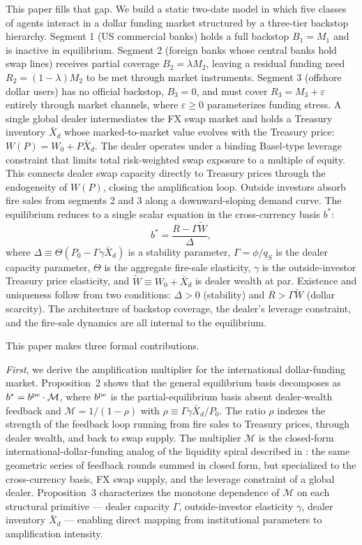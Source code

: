 This paper fills that gap. We build a static two-date model in which five classes of agents interact
in a dollar funding market structured by a three-tier backstop hierarchy. Segment 1 (US commercial
banks) holds a full backstop $B_1 = M_1$ and is inactive in equilibrium. Segment 2 (foreign banks
whose central banks hold swap lines) receives partial coverage $B_2 = \lambda M_2$, leaving a
residual funding need $R_2 = (1-\lambda)M_2$ to be met through market instruments. Segment 3
(offshore dollar users) has no official backstop, $B_3 = 0$, and must cover $R_3 = M_3 + \varepsilon$
entirely through market channels, where $\varepsilon \geq 0$ parameterizes funding stress. A single
global dealer intermediates the FX swap market and holds a Treasury inventory $\bar{X}_d$ whose
marked-to-market value evolves with the Treasury price: $W(P) = W_0 + P\bar{X}_d$. The dealer
operates under a binding Basel-type leverage constraint that limits total risk-weighted swap
exposure to a multiple of equity. This connects dealer swap capacity directly to Treasury prices
through the endogeneity of $W(P)$, closing the amplification loop. Outside investors absorb fire
sales from segments 2 and 3 along a downward-sloping demand curve. The equilibrium reduces to a
single scalar equation in the cross-currency basis $b^*$:
\begin{equation}
  b^* = \frac{R - \Gamma\tilde{W}}{\Delta},
  \label{eq:intro-eq}
\end{equation}
where $\Delta \equiv \Theta(P_0 - \Gamma\gamma\bar{X}_d)$ is a stability parameter, $\Gamma = \phi/q_S$
is the dealer capacity parameter, $\Theta$ is the aggregate fire-sale elasticity, $\gamma$ is the
outside-investor Treasury price elasticity, and $\tilde{W} \equiv W_0 + \bar{X}_d$ is dealer wealth at
par. Existence and uniqueness follow from two conditions: $\Delta > 0$ (stability) and $R > \Gamma\tilde{W}$
(dollar scarcity). The architecture of backstop coverage, the dealer's leverage constraint, and the
fire-sale dynamics are all internal to the equilibrium.

This paper makes three formal contributions.

\textit{First}, we derive the amplification multiplier for the international dollar-funding market.
Proposition~2 shows that the general equilibrium basis decomposes as
$b^* = b^{\rm pe} \cdot \mathcal{M}$,
where $b^{\rm pe}$ is the partial-equilibrium basis absent dealer-wealth feedback and
$\mathcal{M} = 1/(1-\rho)$ with $\rho \equiv \Gamma\gamma\bar{X}_d/P_0$.
The ratio $\rho$ indexes the strength of the feedback loop running from fire sales to Treasury
prices, through dealer wealth, and back to swap supply. The multiplier $\mathcal{M}$ is the closed-form
international-dollar-funding analog of the liquidity spiral described in
\citet{BrunnermeierPedersen2009}: the same geometric series of feedback rounds summed in closed
form, but specialized to the cross-currency basis, FX swap supply, and the leverage constraint
of a global dealer. Proposition~3 characterizes the monotone dependence of $\mathcal{M}$ on each
structural primitive — dealer capacity $\Gamma$, outside-investor elasticity $\gamma$, dealer
inventory $\bar{X}_d$ — enabling direct mapping from institutional parameters to amplification
intensity.

